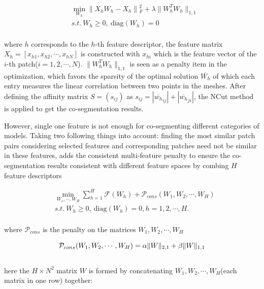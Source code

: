 \small{
\begin{equation}
 \label{eq:SSC}
 \begin{split}
 &\min_{W_{h}}\|X_{h}W_{h}-X_{h}\|{_{F}^2}+\lambda\|W_{h}^{T}W_{h}\|_{1,1} \\
 &s.t.~W_{h}\ge0,~\textrm{diag}(W_{h})=0
 \end{split}
\end{equation}
}
\\
where $h$ corresponds to the $h$-th feature descriptor,
the feature matrix $X_{h}=[x_{h1},x_{h2},\cdots,x_{hN}]$ is constructed with $x_{hi}$ which is the feature vector of the $i$-th patch($i=1,2,\cdots,N$).
$\|W_{h}^{T}W_{h}\|_{1,1}$ is seen as a penalty item in the optimization, which favors the sparsity of the optimal solution $\overline{W_{h}}$ of which each entry measures the linear correlation between two points in the meshes.
After defining the affinity matrix $S=(s_{ij})$ as $s_{ij}=|\overline{w_{h}}_{ij}|+|\overline{w_{h}}_{ji}|$, the NCut method\cite{shi2000normalized} is applied to get the co-segmentation results.

However, single one feature is not enough for co-segmenting different categories of models.
Taking two following things into account:
finding the most similar patch pairs considering selected features and corresponding patches need not be similar in these features,
\cite{hu2012co} adds the consistent multi-feature penalty to ensure the co-segmentation results consistent with different feature spaces by combing $H$ feature descriptors

\small{
\begin{equation}
 \label{eq:coseg1}
 \begin{split}
 &\min_{W_{1},\cdots,W_{H}}\sum_{h=1}^{H}\mathcal{F}(W_{h})+\mathcal{P}_{cons}(W_1,W_2,\cdots,W_H)\\
 &s.t.~W_{h}\ge0,~\textrm{diag}(W_{h})=0,h=1,2,\cdots,H.
 \end{split}
\end{equation}
}
\\
where $\mathcal{P}_{cons}$ is the penalty on the matrices $W_1,W_2,\cdots,W_H$

\small{
\begin{equation}
 \label{eq:coseg2}
 \mathcal{P}_{cons}(W_1,W_2,\cdots,W_H)=\alpha\|W\|_{2,1}+\beta\|W\|_{1,1}\\
\end{equation}
}
\\
here the $H\times N^2$ matrix $W$ is formed by concatenating $W_1,W_2,\cdots,W_H$(each matrix in one row) together:

